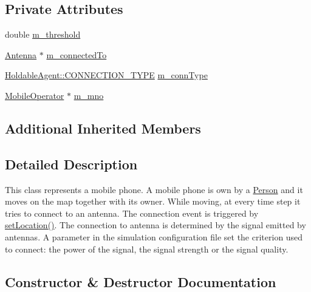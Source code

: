 \subsection*{Private Attributes}
\begin{DoxyCompactItemize}
\item 
double \mbox{\hyperlink{class_mobile_phone_afb6364675f7cf6e09856f49ae6c10563}{m\+\_\+threshold}}
\item 
\mbox{\hyperlink{class_antenna}{Antenna}} $\ast$ \mbox{\hyperlink{class_mobile_phone_aa143b94346485788c3563228f6043721}{m\+\_\+connected\+To}}
\item 
\mbox{\hyperlink{class_holdable_agent_ae2c334b004d7b9c5a999cf2618e4e518}{Holdable\+Agent\+::\+C\+O\+N\+N\+E\+C\+T\+I\+O\+N\+\_\+\+T\+Y\+PE}} \mbox{\hyperlink{class_mobile_phone_a39f69fef45f380e3922dfe78b904372d}{m\+\_\+conn\+Type}}
\item 
\mbox{\hyperlink{class_mobile_operator}{Mobile\+Operator}} $\ast$ \mbox{\hyperlink{class_mobile_phone_a1b26abc840ac8f8679dd62939330c597}{m\+\_\+mno}}
\end{DoxyCompactItemize}
\subsection*{Additional Inherited Members}


\subsection{Detailed Description}
This class represents a mobile phone. A mobile phone is own by a \mbox{\hyperlink{class_person}{Person}} and it moves on the map together with its owner. While moving, at every time step it tries to connect to an antenna. The connection event is triggered by \mbox{\hyperlink{class_holdable_agent_aec98d2fe325b48d9a84ad3dad44700e0}{set\+Location()}}. The connection to antenna is determined by the signal emitted by antennas. A parameter in the simulation configuration file set the criterion used to connect\+: the power of the signal, the signal strength or the signal quality. 

\subsection{Constructor \& Destructor Documentation}
\mbox{\label{class_mobile_phone_afd7beed70eb2af3baecd9521332ba8eb}} 
